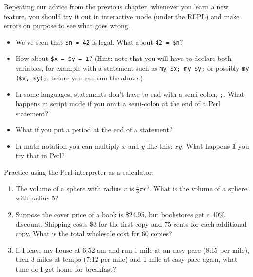 \begin{exercise}

Repeating our advice from the previous chapter, whenever you learn
a new feature, you should try it out in interactive mode (under 
the REPL) and make errors on purpose to see what goes wrong.

\begin{itemize}

\item We've seen that {\tt \$n = 42} is legal.  What about {\tt 42 = \$n}?

\item How about {\tt \$x = \$y = 1}? (Hint: note that you will 
have to declare both variables, for example with a statement 
such as {\tt my \$x; my \$y;} or possibly {\tt my (\$x, \$y);}, 
before you can run the above.)

\item In some languages, statements don't have to end with a semi-colon, 
{\tt ;}. What happens in script mode if you omit a semi-colon at the end
of a Perl statement?

\item What if you put a period at the end of a statement?

\item In math notation you can multiply $x$ and $y$ like this: $x y$.
What happens if you try that in Perl?

\end{itemize}

\end{exercise}


\begin{exercise}

Practice using the Perl interpreter as a calculator: 

\begin{enumerate}

\item The volume of a sphere with radius $r$ is $\frac{4}{3} \pi r^3$.
  What is the volume of a sphere with radius 5?

\item Suppose the cover price of a book is \$24.95, but bookstores get a
  40\% discount.  Shipping costs \$3 for the first copy and 75 cents
  for each additional copy.  What is the total wholesale cost for
  60 copies?

\item If I leave my house at 6:52 am and run 1 mile at an easy pace
  (8:15 per mile), then 3 miles at tempo (7:12 per mile) and 1 mile at
  easy pace again, what time do I get home for breakfast?

\end{enumerate}
\end{exercise}

